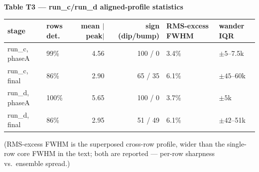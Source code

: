 \documentclass[11pt]{article}
\begin{document}
\begin{center}\small
\textbf{Table T3 --- run\_c/run\_d aligned-profile statistics}\\[3pt]
\begin{tabular}{llrrll}
\toprule
stage & rows det. & mean $|$peak$|$ & sign (dip/bump) & RMS-excess FWHM & wander IQR\\
\midrule
run\_c, phaseA & 99\% & 4.56 & 100 / 0 & 3.4\% & $\pm5$--7.5k\\
run\_c, final & 86\% & 2.90 & 65 / 35 & 6.1\% & $\pm45$--60k\\
run\_d, phaseA & 100\% & 5.65 & 100 / 0 & 3.7\% & $\pm5$k\\
run\_d, final & 86\% & 2.95 & 51 / 49 & 6.1\% & $\pm42$--51k\\
\bottomrule
\end{tabular}
\end{center}
(RMS-excess FWHM is the superposed cross-row profile, wider than the single-row core FWHM in the text;
both are reported --- per-row sharpness vs.\ ensemble spread.)
\end{document}
